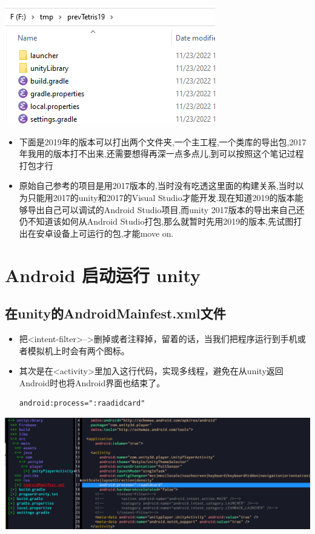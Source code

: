\documentclass[9pt, b5paper]{article}
\begin{document}
\includegraphics[width=.9\linewidth]{./pic/unityToAndroid_20221123_222322.png}
\begin{itemize}
\item 下面是2019年的版本可以打出两个文件夹,一个主工程,一个类库的导出包,2017年我用的版本打不出来,还需要想得再深一点多点儿,到可以按照这个笔记过程打包才行
\item 原始自己参考的项目是用2017版本的,当时没有吃透这里面的构建关系,当时以为只能用2017的unity和2017的Visual Studio才能开发.现在知道2019的版本能够导出自己可以调试的Android Studio项目,而unity 2017版本的导出来自己还仍不知道该如何从Android Studio打包,那么就暂时先用2019的版本,先试图打出在安卓设备上可运行的包,才能move on.
\end{itemize}

\section{Android  启动运行 unity}
\label{sec-5}
\subsection{在unity的AndroidMainfest.xml文件}
\label{sec-5-1}
\begin{itemize}
\item 把<intent-filter>-->删掉或者注释掉，留着的话，当我们把程序运行到手机或者模拟机上时会有两个图标。
\item 其次是在<activity>里加入这行代码，实现多线程，避免在从unity返回Android时也将Android界面也结束了。
\begin{verbatim}
android:process=":raadidcard"
\end{verbatim}
\end{itemize}

\includegraphics[width=.9\linewidth]{./pic/unityToAndroid_20221123_223227.png}
\end{document}
